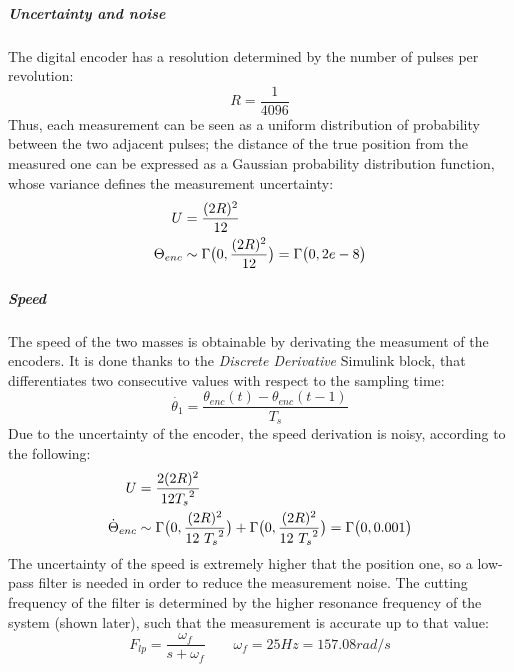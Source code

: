 \subparagraph{Uncertainty and noise}

The digital encoder has a resolution determined by the number of pulses per revolution:
\[
	R = \frac{1}{4096}
\]
Thus, each measurement can be seen as a uniform distribution of probability between the two adjacent pulses; the distance of the true position from the measured one can be expressed as a Gaussian probability distribution function, whose variance defines the measurement uncertainty:
\begin{align*}
	U &= \frac{(2R)^2}{12} \\
	\Theta_{enc} &\sim \Gamma \bigl{(} 0,\frac{(2R)^2}{12} \bigr{)} = \Gamma \bigl{(} 0, 2e-8 \bigr{)}
\end{align*}

\subparagraph{Speed}

The speed of the two masses is obtainable by derivating the measument of the encoders. It is done thanks to the \textit{Discrete Derivative} Simulink block, that differentiates two consecutive values with respect to the sampling time:
\[
	\dot{\theta_1} = \frac{ \theta_{enc}(t) - \theta_{enc}(t-1)}{T_s}
\]
Due to the uncertainty of the encoder, the speed derivation is noisy, according to the following:
\begin{align*}
	U &= \frac{2(2R)^2}{12 {T_s}^2 } \\
	\dot{\Theta}_{enc}	&\sim \Gamma \bigl{(} 0,\frac{(2R)^2}{12 \ {T_s}^2} \bigr{)} + \Gamma \bigl{(} 0,\frac{(2R)^2}{12 \ {T_s}^2} \bigr{)} = \Gamma \bigl{(} 0, 0.001 \bigr{)}
\end{align*}
The uncertainty of the speed is extremely higher that the position one, so a low-pass filter is needed in order to reduce the measurement noise. The cutting frequency of the filter is determined by the higher resonance frequency of the system (shown later), such that the measurement is accurate up to that value:
\[
	F_{lp} = \frac{ \omega_f }{ s+\omega_f} \qquad \omega_f=25Hz=157.08 rad/s
\]